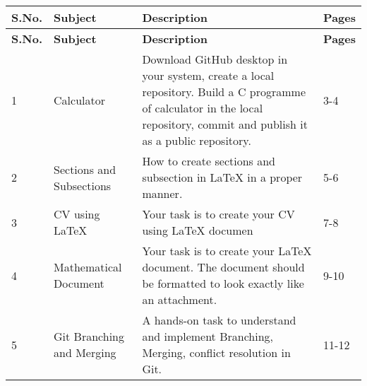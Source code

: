 \documentclass{article}
\begin{document}
\begin{center}
    
\large \begin{longtable}{|p{}|p{}|p{}|p{}|}
    \hline
    \textbf{\Large S.No.} & \textbf{\Large Subject} & \textbf{\Large Description} & \textbf{\Large Pages} \\
    \hline
    \endfirsthead
    \hline
    \textbf{\Large S.No.} & \textbf{\Large Subject} & \textbf{\Large Description} & \textbf{\Large Pages} \\
    \hline
    \endhead
    \hline
    1 & Calculator & Download GitHub desktop in your system, create a local repository. Build a C programme of calculator in the local repository, commit and publish it as a public repository. & 3-4 \\
    \hline
    2 & Sections and Subsections & How to create sections and subsection in LaTeX in a proper manner. & 5-6 \\
    \hline
    3 & CV using LaTeX & Your task is to create your CV using LaTeX documen & 7-8 \\
    \hline
    4 & Mathematical Document & Your task is to create your LaTeX document. 
    The document should be formatted to look exactly like an attachment. & 9-10 \\
    \hline
    5 & Git Branching and Merging & A hands-on task to understand and implement Branching, Merging, conflict resolution in Git. & 11-12 \\
    
    
\end{longtable}
\end{center}
\end{document}
